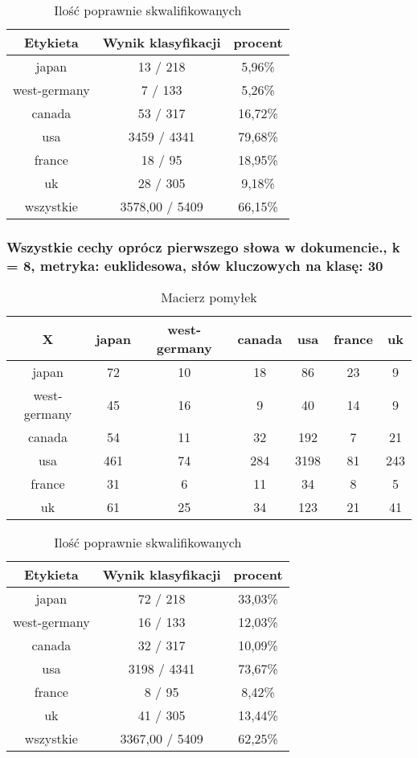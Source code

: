 \documentclass{classrep}
\begin{document}
\begin{table}[h]
\centering
\begin{tabular}{|c|c|c|}
\hline
Etykieta & Wynik klasyfikacji & procent\\
\hline
japan & 13 / 218 & 5,96\%\\
\hline
west-germany & 7 / 133 & 5,26\%\\
\hline
canada & 53 / 317 & 16,72\%\\
\hline
usa & 3459 / 4341 & 79,68\%\\
\hline
france & 18 / 95 & 18,95\%\\
\hline
uk & 28 / 305 & 9,18\%\\
\hline
wszystkie & 3578,00 / 5409 & 66,15\%\\
\hline
\end{tabular}
\caption{Ilość poprawnie skwalifikowanych}\end{table}

\subsubsection{Wszystkie cechy oprócz pierwszego słowa w dokumencie., k = 8, metryka: euklidesowa, słów kluczowych na klasę: 30}
\begin{table}[h]
\centering
\begin{tabular}{|c|c|c|c|c|c|c|}
\hline
 X  & japan & west-germany & canada & usa & france & uk\\
\hline
japan & 72 & 10 & 18 & 86 & 23 & 9\\
\hline
west-germany & 45 & 16 & 9 & 40 & 14 & 9\\
\hline
canada & 54 & 11 & 32 & 192 & 7 & 21\\
\hline
usa & 461 & 74 & 284 & 3198 & 81 & 243\\
\hline
france & 31 & 6 & 11 & 34 & 8 & 5\\
\hline
uk & 61 & 25 & 34 & 123 & 21 & 41\\
\hline
\end{tabular}
\caption{Macierz pomyłek}\end{table}

\begin{table}[h]
\centering
\begin{tabular}{|c|c|c|}
\hline
Etykieta & Wynik klasyfikacji & procent\\
\hline
japan & 72 / 218 & 33,03\%\\
\hline
west-germany & 16 / 133 & 12,03\%\\
\hline
canada & 32 / 317 & 10,09\%\\
\hline
usa & 3198 / 4341 & 73,67\%\\
\hline
france & 8 / 95 & 8,42\%\\
\hline
uk & 41 / 305 & 13,44\%\\
\hline
wszystkie & 3367,00 / 5409 & 62,25\%\\
\hline
\end{tabular}
\caption{Ilość poprawnie skwalifikowanych}\end{table}
\end{document}
